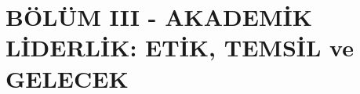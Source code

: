 \documentclass[
  letterpaper,
  DIV=11,
  numbers=noendperiod]{scrreprt}
\begin{document}
\chapter{}\label{section-12}

\chapter{}\label{section-13}

\chapter{}\label{section-14}

\part{BÖLÜM III - AKADEMİK LİDERLİK: ETİK, TEMSİL ve GELECEK}

\chapter{}\label{section-15}

\chapter{}\label{section-16}

\chapter{}\label{section-17}

\chapter{}\label{section-18}

\chapter{}\label{section-19}

\chapter{}\label{section-20}

\chapter{}\label{section-21}

\chapter{}\label{section-22}
\end{document}
